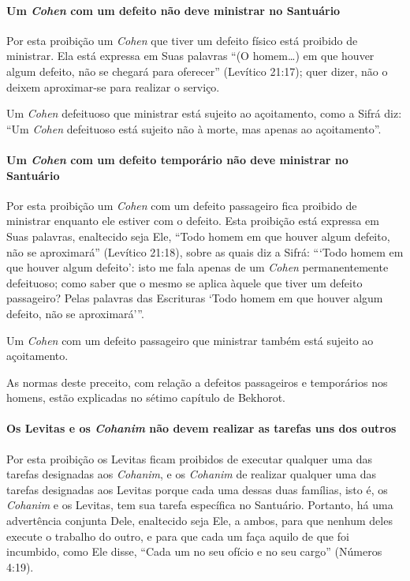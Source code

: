 \paragraph{Um \textit{Cohen} com um defeito não deve ministrar no Santuário}

Por esta proibição um \textit{Cohen} que tiver um defeito físico está
proibido de ministrar. Ela está expressa em Suas palavras ``(O homem\ldots{})
em que houver algum defeito, não se chegará para oferecer'' (Levítico
21:17); quer dizer, não o deixem aproximar-se para realizar o serviço.

Um \textit{Cohen} defeituoso que ministrar está sujeito ao açoitamento, como
a Sifrá diz: ``Um \textit{Cohen} defeituoso está sujeito não à morte, mas
apenas ao açoitamento''.

\paragraph{Um \textit{Cohen} com um defeito temporário não deve ministrar no Santuário}

Por esta proibição um \textit{Cohen} com um defeito passageiro fica proibido
de ministrar enquanto ele estiver com o defeito. Esta proibição está
expressa em Suas palavras, enaltecido seja Ele, ``Todo homem em que
houver algum defeito, não se aproximará'' (Levítico 21:18), sobre as
quais diz a Sifrá: ```Todo homem em que houver algum defeito': isto me
fala apenas de um \textit{Cohen} permanentemente defeituoso; como saber que o mesmo se aplica àquele que tiver um defeito passageiro? Pelas palavras das Escrituras `Todo homem
em que houver algum defeito, não se aproximará'''.

Um \textit{Cohen} com um defeito passageiro que ministrar também está
sujeito ao açoitamento.

As normas deste preceito, com relação a defeitos passageiros e
temporários nos homens, estão explicadas no sétimo capítulo de Bekhorot.

\paragraph{Os Levitas e os \textit{Cohanim} não devem realizar as tarefas uns dos outros}

Por esta proibição os Levitas ficam proibidos de executar qualquer uma
das tarefas designadas aos \textit{Cohanim}, e os \textit{Cohanim} de realizar
qualquer uma das tarefas designadas aos Levitas porque cada uma dessas
duas famílias, isto é, os \textit{Cohanim} e os Levitas, tem sua tarefa
específica no Santuário. Portanto, há uma advertência conjunta Dele,
enaltecido seja Ele, a ambos, para que nenhum deles execute o trabalho
do outro, e para que cada um faça aquilo de que foi incumbido, como Ele
disse, ``Cada um no seu ofício e no seu cargo'' (Números 4:19).

